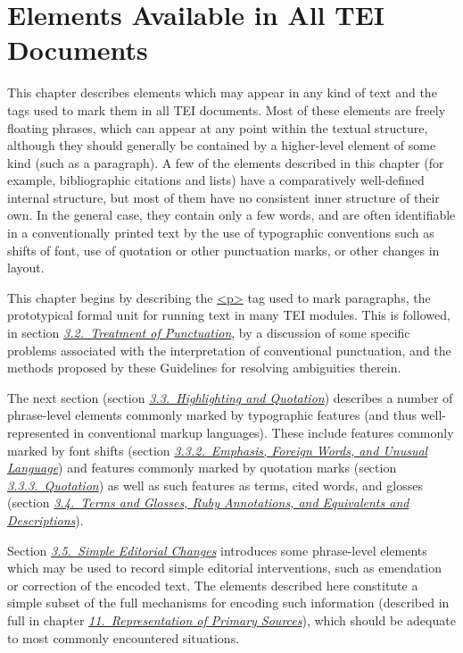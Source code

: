 
\section[{Elements Available in All TEI Documents}]{Elements Available in All TEI Documents}\label{CO}\par
This chapter describes elements which may appear in any kind of text and the tags used to mark them in all TEI documents. Most of these elements are freely floating phrases, which can appear at any point within the textual structure, although they should generally be contained by a higher-level element of some kind (such as a paragraph). A few of the elements described in this chapter (for example, bibliographic citations and lists) have a comparatively well-defined internal structure, but most of them have no consistent inner structure of their own. In the general case, they contain only a few words, and are often identifiable in a conventionally printed text by the use of typographic conventions such as shifts of font, use of quotation or other punctuation marks, or other changes in layout.\par
This chapter begins by describing the \hyperref[TEI.p]{<p>} tag used to mark paragraphs, the prototypical formal unit for running text in many TEI modules. This is followed, in section \textit{\hyperref[COPU]{3.2.\ Treatment of Punctuation}}, by a discussion of some specific problems associated with the interpretation of conventional punctuation, and the methods proposed by these Guidelines for resolving ambiguities therein.\par
The next section (section \textit{\hyperref[COHQ]{3.3.\ Highlighting and Quotation}}) describes a number of phrase-level elements commonly marked by typographic features (and thus well-represented in conventional markup languages). These include features commonly marked by font shifts (section \textit{\hyperref[COHQH]{3.3.2.\ Emphasis, Foreign Words, and Unusual Language}}) and features commonly marked by quotation marks (section \textit{\hyperref[COHQQ]{3.3.3.\ Quotation}}) as well as such features as terms, cited words, and glosses (section \textit{\hyperref[COHTGEDR]{3.4.\ Terms and Glosses, Ruby Annotations, and Equivalents and Descriptions}}).\par
Section \textit{\hyperref[COED]{3.5.\ Simple Editorial Changes}} introduces some phrase-level elements which may be used to record simple editorial interventions, such as emendation or correction of the encoded text. The elements described here constitute a simple subset of the full mechanisms for encoding such information (described in full in chapter \textit{\hyperref[PH]{11.\ Representation of Primary Sources}}), which should be adequate to most commonly encountered situations.\par
